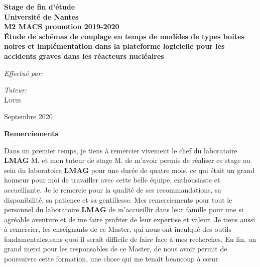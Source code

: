 \documentclass[11pt,a4paper]{scrartcl}%
\title{}
\author{}
\date{}
\begin{document}
	 \begin{titlepage}
		\begin{center}
			\textbf{\LARGE Stage de fin d'étude\\ Université de Nantes\\ M2 MACS promotion 2019-2020}\\ [2cm]
			{\huge \bfseries  Étude de schémas de couplage en temps de modèles de types boites noires et implémentation dans la plateforme logicielle  pour les accidents graves dans les réacteurs nucléaires\\ [0.4cm] }
			\vspace*{+40mm}
			\begin{minipage}{0.4\textwidth}
				\begin{flushleft} \large
					\emph{Effectué par:}\\ \textsc{ }
				\end{flushleft}
			\end{minipage}
			\hspace*{+26mm} \vspace*{+40mm}
			\begin{minipage}{0.4\textwidth}
				\begin{flushleft} \large
					\emph{Tuteur:}\\ \textsc{Louis \text{VIOT}}
				\end{flushleft}
			\end{minipage}
			\vfill
			{\large   Septembre 2020}
		\end{center}
	\end{titlepage}
\newpage
	\begin{center}
		\textbf{ Remerciements}
	\end{center}
	Dans un premier temps, je tiens à remercier vivement le chef du laboratoire \textbf{LMAG} M.  et mon tuteur de stage M.  de m’avoir permis de réaliser ce stage au sein du laboratoire \textbf{LMAG} pour une durée de quatre mois, ce qui était un grand honneur pour moi de travailler avec cette belle équipe, enthousiaste et accueillante. Je le remercie pour la qualité de ses recommandations, sa disponibilité, sa patience et sa gentillesse. Mes remerciements pour tout le personnel du laboratoire \textbf{LMAG} de m'accueillir dans leur famille pour une si agréable aventure et de me faire profiter  de leur expertise et valeur. Je tiens aussi à remercier, les enseignants de ce Master, qui nous ont inculqué des outils fondamentales,sans quoi il serait difficile de faire face à mes recherches. En fin, un grand merci pour les responsables de ce Master, de nous avoir permit de poursuivre cette formation, une chose qui me tenait beaucoup à cœur.
	\newpage
	\tableofcontents
	\listoffigures 
	\newpage
\end{document}
